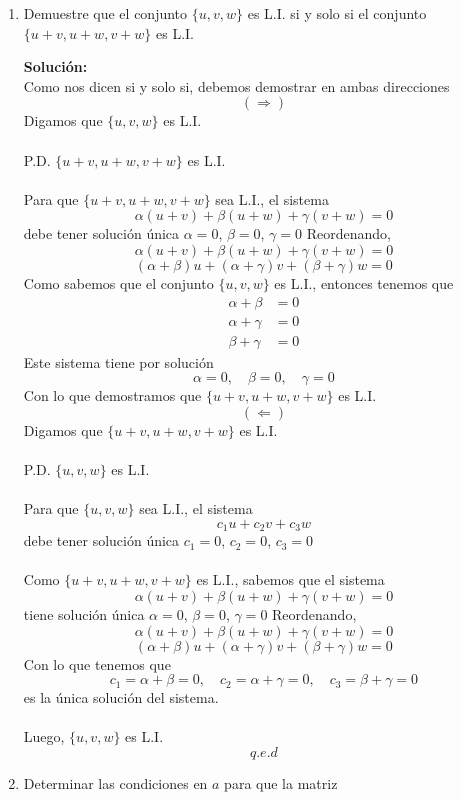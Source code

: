 \documentclass[12pt]{article}
\newenvironment{solucion}
{\begin{mdframed}[backgroundcolor=black!10]
		{\bf Solución:}\\
	}
	{
	\end{mdframed}
}
\newenvironment{preguntas}
{\begin{enumerate}\itemsep12pt
	}
	{
	\end{enumerate}
}
\begin{document}
\begin{preguntas}
\item Demuestre que el conjunto $\{u, v, w\}$ es L.I. si y solo si el conjunto $\{u+v, u+w, v+w\}$ es L.I.
\begin{solucion}
Como nos dicen si y solo si, debemos demostrar en ambas direcciones
		$$(\Longrightarrow)$$
		Digamos que $\{u, v, w\}$ es L.I.\\
		\\
		P.D. $\{u+v, u+w, v+w\}$ es L.I.\\
		\\
		Para que $\{u+v, u+w, v+w\}$ sea L.I., el sistema
		$$\alpha (u+v) + \beta (u+w) + \gamma (v+w) = 0$$
		debe tener solución única $\alpha = 0$, $\beta = 0$, $\gamma = 0$
		Reordenando,
		$$\alpha (u+v) + \beta (u+w) + \gamma (v+w) = 0$$
		$$(\alpha + \beta) u + (\alpha + \gamma) v + (\beta + \gamma) w = 0$$
		Como sabemos que el conjunto $\{u, v, w\}$ es L.I., entonces tenemos que
		$$\begin{array}{rl}
		\alpha + \beta & = 0\\
		\alpha + \gamma & = 0\\
		\beta + \gamma & = 0
		\end{array}$$
		Este sistema tiene por solución
		$$\alpha = 0, \quad \beta = 0, \quad \gamma = 0$$
		Con lo que demostramos que $\{u+v, u+w, v+w\}$ es L.I.
		$$(\Longleftarrow)$$
		Digamos que $\{u+v, u+w, v+w\}$ es L.I.\\
		\\
		P.D. $\{u, v, w\}$ es L.I.\\
		\\
		Para que $\{u, v, w\}$ sea L.I., el sistema
		$$c_1u + c_2v + c_3w$$
		debe tener solución única $c_1 = 0$, $c_2 = 0$, $c_3 = 0$\\
		\\
		Como $\{u+v, u+w, v+w\}$ es L.I., sabemos que el sistema
		$$\alpha (u+v) + \beta (u+w) + \gamma (v+w) = 0$$
		tiene solución única $\alpha = 0$, $\beta = 0$, $\gamma = 0$
		Reordenando,
		$$\alpha (u+v) + \beta (u+w) + \gamma (v+w) = 0$$
		$$(\alpha + \beta) u + (\alpha + \gamma) v + (\beta + \gamma) w = 0$$
		Con lo que tenemos que
		$$c_1 = \alpha + \beta = 0, \quad c_2 = \alpha + \gamma = 0, \quad c_3 = \beta + \gamma = 0$$
		es la única solución del sistema. \\
		\\
		Luego, $\{u, v, w\}$ es L.I.
		$$q.e.d$$
\end{solucion}
\item Determinar las condiciones en $a$ para que la matriz

\end{preguntas}
\end{document}
